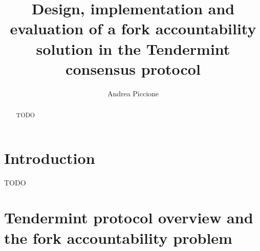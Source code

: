 \documentclass[a4paper,11pt,oneside]{report}
\title{Design, implementation and evaluation of a fork accountability\\solution in the Tendermint consensus protocol}
\author{Andrea Piccione}
\begin{document}
\maketitle

\begin{abstract}

TODO

\end{abstract}

\maketoc

\chapter{Introduction}

TODO

\chapter{Tendermint protocol overview and the fork accountability problem}
\end{document}
